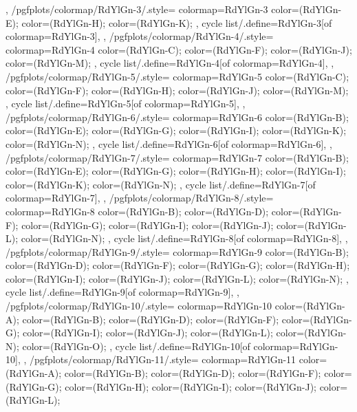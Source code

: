 {{  },
  /pgfplots/colormap/RdYlGn-3/.style={
    colormap={RdYlGn-3}{
      color=(RdYlGn-E);
      color=(RdYlGn-H);
      color=(RdYlGn-K);
    },
    cycle list/.define={RdYlGn-3}{[of colormap=RdYlGn-3]},
  },
  /pgfplots/colormap/RdYlGn-4/.style={
    colormap={RdYlGn-4}{
      color=(RdYlGn-C);
      color=(RdYlGn-F);
      color=(RdYlGn-J);
      color=(RdYlGn-M);
    },
    cycle list/.define={RdYlGn-4}{[of colormap=RdYlGn-4]},
  },
  /pgfplots/colormap/RdYlGn-5/.style={
    colormap={RdYlGn-5}{
      color=(RdYlGn-C);
      color=(RdYlGn-F);
      color=(RdYlGn-H);
      color=(RdYlGn-J);
      color=(RdYlGn-M);
    },
    cycle list/.define={RdYlGn-5}{[of colormap=RdYlGn-5]},
  },
  /pgfplots/colormap/RdYlGn-6/.style={
    colormap={RdYlGn-6}{
      color=(RdYlGn-B);
      color=(RdYlGn-E);
      color=(RdYlGn-G);
      color=(RdYlGn-I);
      color=(RdYlGn-K);
      color=(RdYlGn-N);
    },
    cycle list/.define={RdYlGn-6}{[of colormap=RdYlGn-6]},
  },
  /pgfplots/colormap/RdYlGn-7/.style={
    colormap={RdYlGn-7}{
      color=(RdYlGn-B);
      color=(RdYlGn-E);
      color=(RdYlGn-G);
      color=(RdYlGn-H);
      color=(RdYlGn-I);
      color=(RdYlGn-K);
      color=(RdYlGn-N);
    },
    cycle list/.define={RdYlGn-7}{[of colormap=RdYlGn-7]},
  },
  /pgfplots/colormap/RdYlGn-8/.style={
    colormap={RdYlGn-8}{
      color=(RdYlGn-B);
      color=(RdYlGn-D);
      color=(RdYlGn-F);
      color=(RdYlGn-G);
      color=(RdYlGn-I);
      color=(RdYlGn-J);
      color=(RdYlGn-L);
      color=(RdYlGn-N);
    },
    cycle list/.define={RdYlGn-8}{[of colormap=RdYlGn-8]},
  },
  /pgfplots/colormap/RdYlGn-9/.style={
    colormap={RdYlGn-9}{
      color=(RdYlGn-B);
      color=(RdYlGn-D);
      color=(RdYlGn-F);
      color=(RdYlGn-G);
      color=(RdYlGn-H);
      color=(RdYlGn-I);
      color=(RdYlGn-J);
      color=(RdYlGn-L);
      color=(RdYlGn-N);
    },
    cycle list/.define={RdYlGn-9}{[of colormap=RdYlGn-9]},
  },
  /pgfplots/colormap/RdYlGn-10/.style={
    colormap={RdYlGn-10}{
      color=(RdYlGn-A);
      color=(RdYlGn-B);
      color=(RdYlGn-D);
      color=(RdYlGn-F);
      color=(RdYlGn-G);
      color=(RdYlGn-I);
      color=(RdYlGn-J);
      color=(RdYlGn-L);
      color=(RdYlGn-N);
      color=(RdYlGn-O);
    },
    cycle list/.define={RdYlGn-10}{[of colormap=RdYlGn-10]},
  },
  /pgfplots/colormap/RdYlGn-11/.style={
    colormap={RdYlGn-11}{
      color=(RdYlGn-A);
      color=(RdYlGn-B);
      color=(RdYlGn-D);
      color=(RdYlGn-F);
      color=(RdYlGn-G);
      color=(RdYlGn-H);
      color=(RdYlGn-I);
      color=(RdYlGn-J);
      color=(RdYlGn-L);
}}}
